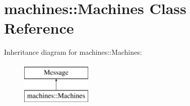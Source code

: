 \hypertarget{classmachines_1_1Machines}{\section{machines\-:\-:Machines Class Reference}
\label{classmachines_1_1Machines}
}
Inheritance diagram for machines\-:\-:Machines\-:\begin{figure}[H]
\begin{center}
\leavevmode
\includegraphics[height=2.000000cm]{classmachines_1_1Machines}
\end{center}
\end{figure}
